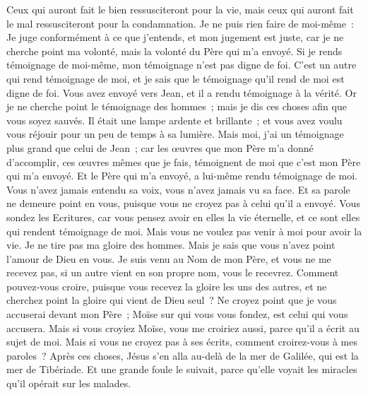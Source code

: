 \begin{multicols}{2}
 Ceux qui auront fait le bien ressusciteront pour la vie, mais ceux qui auront fait le mal ressusciteront pour la condamnation.
Je ne puis rien faire de moi-même~: Je juge conformément à ce que j'entends, et mon jugement est juste, car je ne cherche point ma volonté, mais la volonté du Père qui m'a envoyé.
Si je rends témoignage de moi-même, mon témoignage n'est pas digne de foi.
C'est un autre qui rend témoignage de moi, et je sais que le témoignage qu'il rend de moi est digne de foi.
Vous avez envoyé vers Jean, et il a rendu témoignage à la vérité.
Or je ne cherche point le témoignage des hommes~; mais je dis ces choses afin que vous soyez sauvés.
Il était une lampe ardente et brillante~; et vous avez voulu vous réjouir pour un peu de temps à sa lumière.
Mais moi, j'ai un témoignage plus grand que celui de Jean~; car les œuvres que mon Père m'a donné d'accomplir, ces œuvres mêmes que je fais, témoignent de moi que c'est mon Père qui m'a envoyé.
Et le Père qui m'a envoyé, a lui-même rendu témoignage de moi. Vous n'avez jamais entendu sa voix, vous n'avez jamais vu sa face.
Et sa parole ne demeure point en vous, puisque vous ne croyez pas à celui qu'il a envoyé.
Vous sondez les Ecritures, car vous pensez avoir en elles la vie éternelle, et ce sont elles qui rendent témoignage de moi.
Mais vous ne voulez pas venir à moi pour avoir la vie.
Je ne tire pas ma gloire des hommes.
Mais je sais que vous n'avez point l'amour de Dieu en vous.
Je suis venu au Nom de mon Père, et vous ne me recevez pas, si un autre vient en son propre nom, vous le recevrez.
Comment pouvez-vous croire, puisque vous recevez la gloire les uns des autres, et ne cherchez point la gloire qui vient de Dieu seul~?
Ne croyez point que je vous accuserai devant mon Père~; Moïse sur qui vous vous fondez, est celui qui vous accusera.
Mais si vous croyiez Moïse, vous me croiriez aussi, parce qu'il a écrit au sujet de moi.
Mais si vous ne croyez pas à ses écrits, comment croirez-vous à mes paroles~?
\VerseOne{}Après ces choses, Jésus s'en alla au-delà de la mer de Galilée, qui est la mer de Tibériade.
Et une grande foule le suivait, parce qu'elle voyait les miracles qu'il opérait sur les malades.

\end{multicols}
